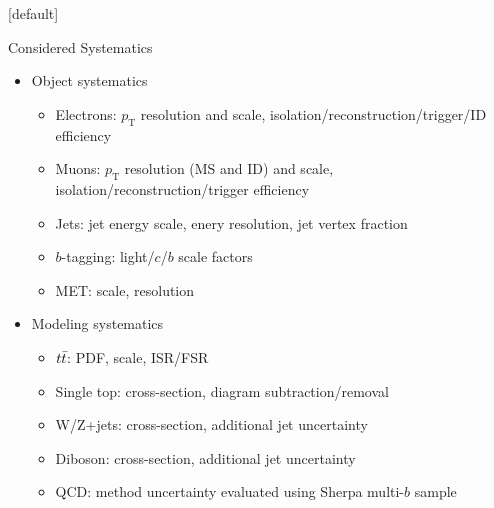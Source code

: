 \documentclass{beamer}
\newcommand*{\ttbar}{\ensuremath{\lowercase{t\bar{t}}}\xspace}
\newcommand*{\pt}{\ensuremath{p_{\text{T}}}\xspace}
\begin{document}
{\makeatletter %
  [default]
  \def\beamer@entrycode{\vspace*{-1.075\headheight}}
  \begin{frame}{Considered Systematics}
    \begin{itemize}
    \item Object systematics
      \begin{itemize}
      \item Electrons: \pt resolution and scale, isolation/reconstruction/trigger/ID efficiency
      \item Muons: \pt resolution (MS and ID) and scale, isolation/reconstruction/trigger efficiency
      \item Jets: jet energy scale, enery resolution, jet vertex fraction 
      \item $b$-tagging: light/$c$/$b$ scale factors
      \item MET: scale, resolution
      \end{itemize}
    \item Modeling systematics
      \begin{itemize}
      \item \ttbar: PDF, scale, ISR/FSR
      \item Single top: cross-section, diagram subtraction/removal
      \item W/Z+jets: cross-section, additional jet uncertainty
      \item Diboson: cross-section, additional jet uncertainty
      \item QCD: method uncertainty evaluated using Sherpa multi-$b$ sample
      \end{itemize}
    \end{itemize}
  \end{frame}

}
\end{document}
